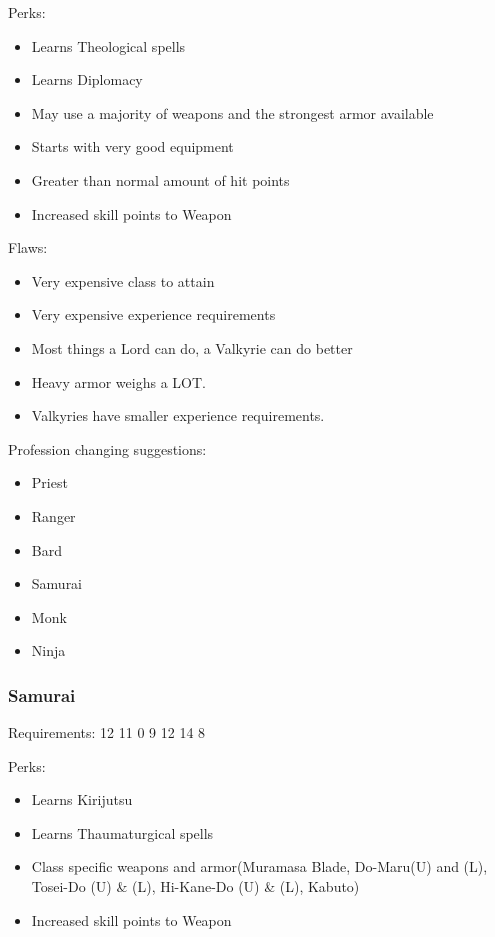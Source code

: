 \documentclass[12pt]{article}
\begin{document}
Perks:

\begin{itemize}
\item
  Learns Theological spells
\item
  Learns Diplomacy
\item
  May use a majority of weapons and the strongest armor available
\item
  Starts with very good equipment
\item
  Greater than normal amount of hit points
\item
  Increased skill points to Weapon
\end{itemize}

Flaws:

\begin{itemize}
\item
  Very expensive class to attain
\item
  Very expensive experience requirements
\item
  Most things a Lord can do, a Valkyrie can do better
\item
  Heavy armor weighs a LOT.
\item
  Valkyries have smaller experience requirements.
\end{itemize}

Profession changing suggestions:

\begin{itemize}
\item
  Priest
\item
  Ranger
\item
  Bard
\item
  Samurai
\item
  Monk
\item
  Ninja
\end{itemize}

\subsubsection{Samurai}\label{samurai}

Requirements: 12 11 0 9 12 14 8

Perks:

\begin{itemize}
\item
  Learns Kirijutsu
\item
  Learns Thaumaturgical spells
\item
  Class specific weapons and armor(Muramasa Blade, Do-Maru(U) and (L),
  Tosei-Do (U) \& (L), Hi-Kane-Do (U) \& (L), Kabuto)
\item
  Increased skill points to Weapon
\end{itemize}
\end{document}

